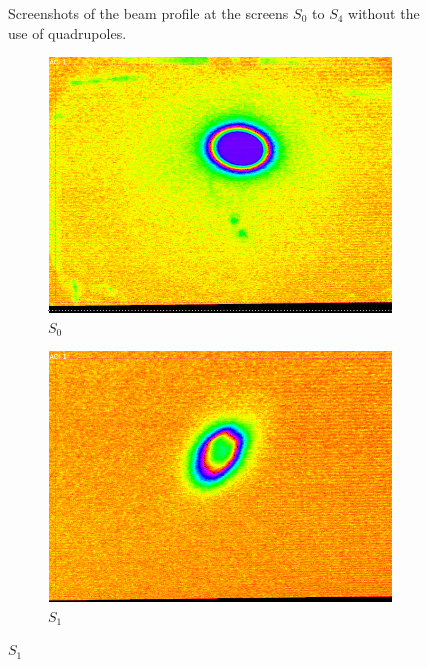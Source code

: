 \documentclass[12pt]{article}
\begin{document}
\begin{figure}[H]
  \caption{Screenshots of the beam profile at the screens $S_0$ to $S_4$ without the use of quadrupoles.}
  \label{before quadrupole}
\end{figure}





\begin{figure}[H]
  \centering

  \begin{subfigure}{0.16\textwidth}
    \includegraphics[width=\linewidth]{fig/S0w.png}
    \caption{$S_0$}
  \end{subfigure}%
  \hfill
  \begin{subfigure}{0.16\textwidth}
    \includegraphics[width=\linewidth]{fig/S1w.png}
    \caption{$S_1$}

\end{subfigure}
\end{figure}
\end{document}
